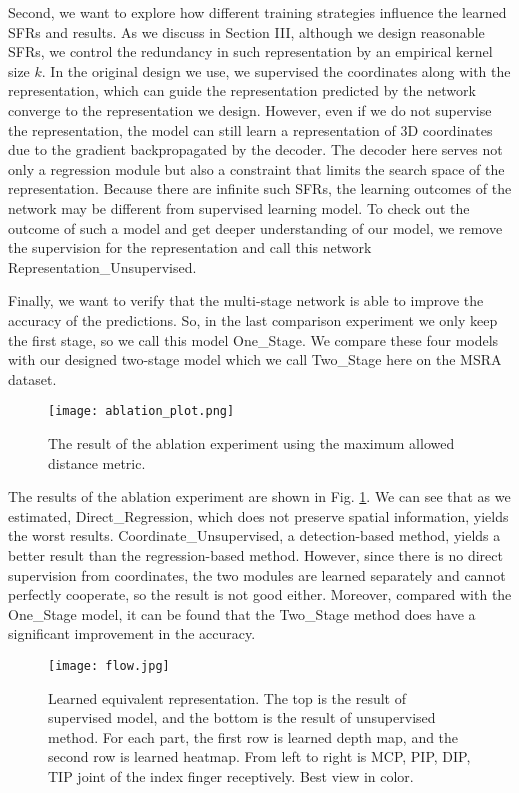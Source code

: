 \documentclass[journal]{IEEEtran}
\begin{document}
Second, we want to explore how different training strategies influence the learned SFRs and results. 
As we discuss in Section III, although we design reasonable SFRs, 
we control the redundancy in such representation by an empirical kernel size $k$. 
In the original design we use, we supervised the coordinates along with the representation, 
which can guide the representation predicted by the network converge to the representation we design. 
However, even if we do not supervise the representation, 
the model can still learn a representation of 3D coordinates due to the gradient backpropagated by the decoder. 
The decoder here serves not only a regression module but also a constraint that limits the search space of the representation. 
Because there are infinite such SFRs, the learning outcomes of the network may be different from supervised learning model. 
To check out the outcome of such a model and get deeper understanding of our model, 
we remove the supervision for the representation and call this network Representation\_Unsupervised. 

Finally, we want to verify that the multi-stage network is able to improve the accuracy of the predictions. 
So, in the last comparison experiment we only keep the first stage, so we call this model One\_Stage. 
We compare these four models with our designed two-stage model which we call Two\_Stage here on the MSRA dataset.

\begin{figure}[!t]
  \centering
  \texttt{[image: ablation\_plot.png]}
  \caption{The result of the ablation experiment using the maximum allowed distance metric.}
  \label{Ablation_Plot}
\end{figure}

The results of the ablation experiment are shown in Fig\@. \ref{Ablation_Plot}. 
We can see that as we estimated, Direct\_Regression, which does not preserve spatial information, yields the worst results. 
Coordinate\_Unsupervised, a detection-based method, yields a better result than the regression-based method. 
However, since there is no direct supervision from coordinates, the two modules are learned separately and cannot perfectly cooperate, so the result is not good either. 
Moreover, compared with the One\_Stage model, it can be found that the Two\_Stage method does have a significant improvement in the accuracy. 

\begin{figure}[!t]
  \centering
  \texttt{[image: flow.jpg]}
  \caption{Learned equivalent representation. 
  The top is the result of supervised model, and the bottom is the result of unsupervised method. 
  For each part, the first row is learned depth map, and the second row is learned heatmap. 
  From left to right is MCP, PIP, DIP, TIP joint of the index finger receptively. Best view in color.
  }
  \label{Ablation_Image}
\end{figure}
\end{document}
